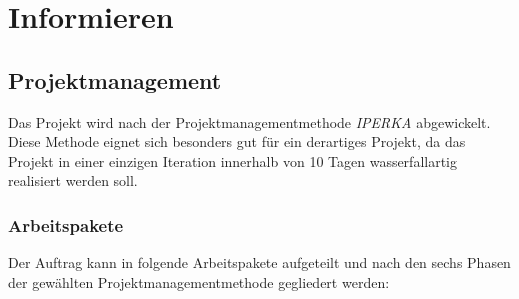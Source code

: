 \chapter{Informieren}
\label{ch:inform}

\section{Projektmanagement}

Das Projekt wird nach der Projektmanagementmethode \emph{IPERKA} abgewickelt. Diese Methode eignet sich besonders gut
für ein derartiges Projekt, da das Projekt in einer einzigen Iteration innerhalb von 10 Tagen wasserfallartig realisiert werden soll.

\subsection{Arbeitspakete}

Der Auftrag kann in folgende Arbeitspakete aufgeteilt und nach den sechs Phasen der gewählten Projektmanagementmethode gegliedert werden:

